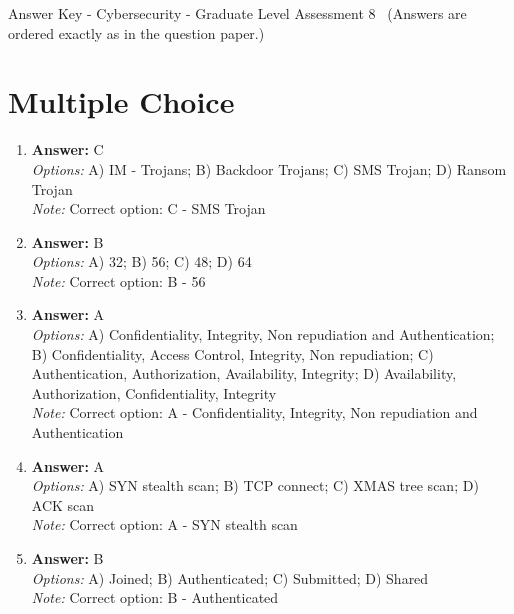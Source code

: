 \documentclass[12pt]{article}
\begin{document}
\begin{center}
Answer Key - Cybersecurity - Graduate Level Assessment 8 \
\small (Answers are ordered exactly as in the question paper.)
\end{center}

\section*{Multiple Choice}
\begin{enumerate}[label=\arabic*.]
\item \textbf{Answer:} C
\\ \textit{Options:} A) IM - Trojans; B) Backdoor Trojans; C) SMS Trojan; D) Ransom Trojan
\\ \textit{Note:} Correct option: C - SMS Trojan
\item \textbf{Answer:} B
\\ \textit{Options:} A) 32; B) 56; C) 48; D) 64
\\ \textit{Note:} Correct option: B - 56
\item \textbf{Answer:} A
\\ \textit{Options:} A) Confidentiality, Integrity, Non repudiation and Authentication; B) Confidentiality, Access Control, Integrity, Non repudiation; C) Authentication, Authorization, Availability, Integrity; D) Availability, Authorization, Confidentiality, Integrity
\\ \textit{Note:} Correct option: A - Confidentiality, Integrity, Non repudiation and Authentication
\item \textbf{Answer:} A
\\ \textit{Options:} A) SYN stealth scan; B) TCP connect; C) XMAS tree scan; D) ACK scan
\\ \textit{Note:} Correct option: A - SYN stealth scan
\item \textbf{Answer:} B
\\ \textit{Options:} A) Joined; B) Authenticated; C) Submitted; D) Shared
\\ \textit{Note:} Correct option: B - Authenticated
\end{enumerate}
\end{document}
